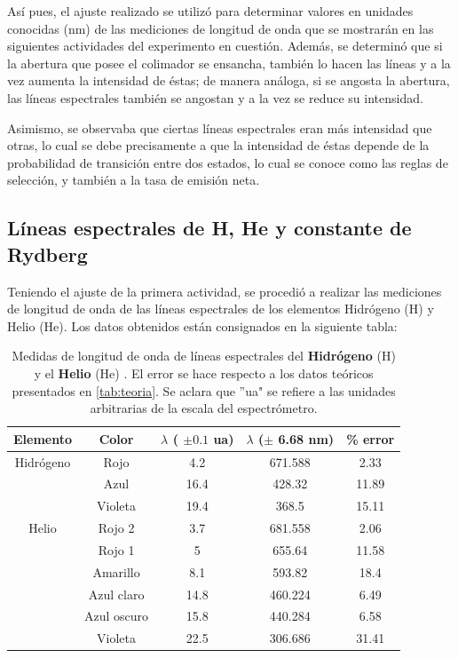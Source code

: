\documentclass[%
 reprint,
 amsmath,amssymb,
 aps,
]{revtex4-1}
\begin{document}
Así pues, el ajuste realizado se utilizó para determinar valores en unidades conocidas (nm) de las mediciones de longitud de onda que se mostrarán en las siguientes actividades del experimento en cuestión. Además, se determinó que si la abertura que posee el colimador se ensancha, también lo hacen las líneas y a la vez aumenta la intensidad de éstas; de manera análoga, si se angosta la abertura, las líneas espectrales también se angostan y a la vez se reduce su intensidad.

Asimismo, se observaba que ciertas líneas espectrales eran más intensidad que otras, lo cual se debe precisamente a que la intensidad de éstas depende de la probabilidad de transición entre dos estados, lo cual se conoce como las reglas de selección, y también a la tasa de emisión neta. \cite{intensidad}

\subsection{Líneas espectrales de H, He y constante de Rydberg}

Teniendo el ajuste de la primera actividad, se procedió a realizar las mediciones de longitud de onda de las líneas espectrales de los elementos Hidrógeno (H) y Helio (He). Los datos obtenidos están consignados en la siguiente tabla:

\begin{table}[H]
    \centering
    \begin{tabular}{|c|c|c|c|c|}
    \hline
    Elemento & Color &  $\lambda$ ( $\pm 0.1$ ua) & $\lambda$ ($\pm$ 6.68 nm) & \% error \\ \hline
    Hidrógeno & Rojo  & 4.2 & 671.588 & 2.33 \\ 
     & Azul & 16.4 & 428.32 & 11.89 \\ 
     & Violeta &  19.4 & 368.5 & 15.11 \\ \hline
    Helio & Rojo 2  & 3.7 & 681.558 & 2.06 \\ 
     & Rojo 1 & 5 & 655.64 & 11.58\\ 
     & Amarillo  & 8.1 & 593.82 & 18.4 \\ 
     & Azul claro & 14.8 & 460.224 & 6.49 \\ 
     & Azul oscuro & 15.8 & 440.284 & 6.58 \\ 
     & Violeta & 22.5 & 306.686 & 31.41 \\ \hline
    \end{tabular}
    \caption{Medidas de longitud de onda de líneas espectrales del \textbf{Hidrógeno} (H) y el \textbf{Helio} (He) . El error se hace respecto a los datos teóricos presentados en \ref{tab:teoria}. Se aclara que ''ua" se refiere a las unidades arbitrarias de la escala del espectrómetro.}
    \label{tab:nobles}
\end{table}
\end{document}
